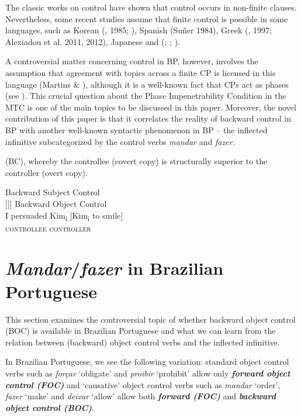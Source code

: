 \documentclass[output=paper]{langsci/langscibook}
\begin{document}
The classic works on control have shown that control occurs in non-finite clauses. Nevertheless, some recent studies assume that finite control is possible in some languages, such as Korean (\citealt{Yang1982}, 1985; \citealt{Borer1989}), Spanish (Suñer 1984), Greek (\citealt{Terzi1992}, 1997; Alexiadou et al. 2011, 2012), Japanese \citep{Uchibori2000} and (\citealt{Farrell1995}; \citealt{Rodrigues2004}; \citealt{Boeckx2006}).

A controversial matter concerning control in BP, however, involves the assumption that agreement with topics across a finite CP is licensed in this language (Martins \& \citealt{Nunes2010}), although it is a well-known fact that CPs act as phases (see \citealt{Chomsky2000}). This crucial question about the Phase Impenetrability Condition in the MTC is one of the main topics to be discussed in this paper. Moreover, the novel contribution of this paper is that it correlates the reality of backward control in BP with another well-known syntactic phenomenon in BP – the inflected infinitive subcategorized by the control verbs \textit{mandar} and \textit{fazer.}

(BC), whereby the controllee (covert copy) is structurally superior to the controller (overt copy):

\ea%
\label{ex:moreno:3}
    \ea Backward Subject Control\\\relax
        [\textsubscript{TP} Bill [\textsubscript{vP} Bill tried [\textsubscript{IP} Bill to [\textsubscript{vP} Bill cut the line]]]]
    \ex Backward Object Control\\
        \gll I persuaded  Kim\textsubscript{i}    [Kim\textsubscript{i}    to smile]  \\
        {}  {}        \textsc{controllee}    \textsc{controller}\\
    \z
\z

\section{\textit{Mandar}/\textit{fazer} in Brazilian Portuguese}%

This section examines the controversial topic of whether backward object control (BOC) is available in Brazilian Portuguese and what we can learn from the relation between (backward) object control verbs and the inflected infinitive.

In Brazilian Portuguese, we see the following variation: standard object control verbs such as \textit{forçar} ‘obligate’ and \textit{proibir} ‘prohibit’ allow only \textbf{\textit{forw}}\textbf{\textit{ard object control (FOC)}}  and ‘causative’ object control verbs such as \textit{mandar} ‘order’, \textit{fazer} ‘make’ and \textit{deixar} ‘allow’ allow both \textbf{\textit{forward (FOC)}} and \textbf{\textit{backward object control (BOC)}}.  
\end{document}
